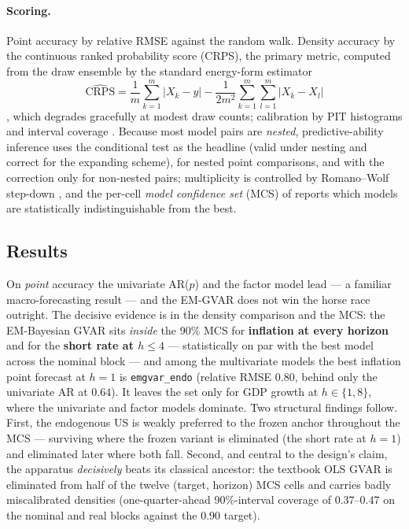 \documentclass[11pt]{article}
\theoremstyle{plain}
\theoremstyle{remark}
\begin{document}
\paragraph{Scoring.} Point accuracy by relative RMSE against the random
walk. Density accuracy by the continuous ranked probability score
(CRPS), the primary metric, computed from the draw ensemble by the
standard energy-form estimator
\begin{equation}\label{eq:crps}
  \widehat{\mathrm{CRPS}}
  = \frac{1}{m}\sum_{k=1}^{m}\lvert X_k - y\rvert
  - \frac{1}{2m^{2}}\sum_{k=1}^{m}\sum_{l=1}^{m}\lvert X_k - X_l\rvert
\end{equation}
\citep{GneitingRaftery2007}, which degrades gracefully at modest draw
counts; calibration by PIT histograms and interval coverage
\citep{Berkowitz2001}. Because most model pairs are \emph{nested},
predictive-ability inference uses the \citet{GiacominiWhite2006}
conditional test as the headline (valid under nesting and correct for
the expanding scheme), \citet{ClarkWest2007} for nested point
comparisons, and \citet{DieboldMariano1995} with the
\citet{HarveyLeybourneNewbold1997} correction only for non-nested pairs;
multiplicity is controlled by Romano--Wolf step-down
\citep{RomanoWolf2005}, and the per-cell \emph{model confidence set}
(MCS) of \citet{HansenLundeNason2011} reports which models are
statistically indistinguishable from the best.

\subsection{Results}\label{sec:oosresults}

On \emph{point} accuracy the univariate AR($p$) and the factor model
lead --- a familiar macro-forecasting result --- and the EM-GVAR does
not win the horse race outright. The decisive evidence is in the density
comparison and the MCS: the EM-Bayesian GVAR sits \emph{inside} the 90\%
MCS for \textbf{inflation at every horizon} and for the \textbf{short
rate at $h \le 4$} --- statistically on par with the best model across
the nominal block --- and among the multivariate models the best
inflation point forecast at $h=1$ is \texttt{emgvar\_endo} (relative
RMSE $0.80$, behind only the univariate AR at $0.64$). It leaves the set
only for GDP growth at $h \in \{1,8\}$, where the univariate and factor
models dominate. Two structural findings follow. First, the endogenous
US is weakly preferred to the frozen anchor throughout the MCS ---
surviving where the frozen variant is eliminated (the short rate at
$h=1$) and eliminated later where both fall. Second, and central to the
design's claim, the apparatus \emph{decisively} beats its classical
ancestor: the textbook OLS GVAR is eliminated from half of the twelve
(target, horizon) MCS cells and carries badly miscalibrated densities
(one-quarter-ahead 90\%-interval coverage of $0.37$--$0.47$ on the
nominal and real blocks against the $0.90$ target).
\end{document}
